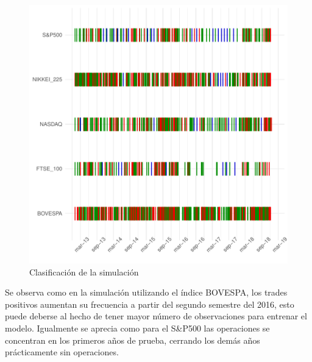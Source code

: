 \documentclass[a4paper,12pt]{Latex/Classes/PhDthesisPSnPDF}
\begin{document}
\begin{figure}[H]
\centering
\includegraphics{main-029}
\caption{Clasificación de la simulación}
\end{figure}

Se observa como en la simulación utilizando el índice BOVESPA, los trades positivos aumentan su frecuencia a partir del segundo semestre del 2016, esto puede deberse al hecho de tener mayor número de observaciones para entrenar el modelo. Igualmente se aprecia como para el S\&P500 las operaciones se concentran en los primeros años de prueba, cerrando los demás años prácticamente sin operaciones.
\end{document}
